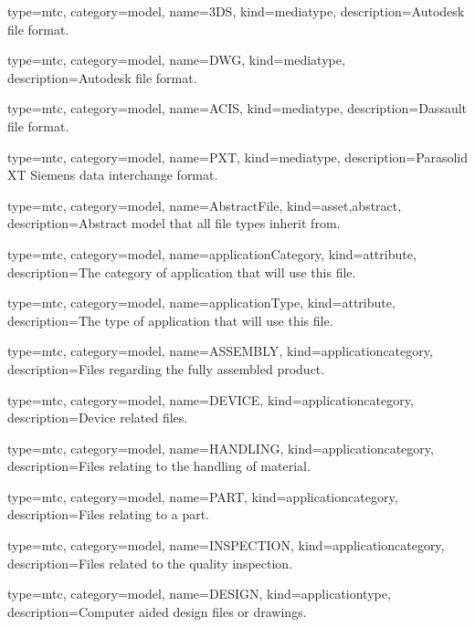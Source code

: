 {
  type=mtc,
  category=model,
  name={3DS},
  kind={mediatype},
  description={Autodesk file format.}
}

{
  type=mtc,
  category=model,
  name={DWG},
  kind={mediatype},
  description={Autodesk file format.}
}

{
  type=mtc,
  category=model,
  name={ACIS},
  kind={mediatype},
  description={Dassault file format.}
}

{
  type=mtc,
  category=model,
  name={PXT},
  kind={mediatype},
  description={Parasolid XT Siemens data interchange format.}
}

{
  type=mtc,
  category=model,
  name={AbstractFile},
  kind={asset,abstract},
  description={Abstract model that all file types inherit from.}
}

{
  type=mtc,
  category=model,
  name={applicationCategory},
  kind={attribute},
  description={The category of application that will use this file.}
}

{
  type=mtc,
  category=model,
  name={applicationType},
  kind={attribute},
  description={The type of application that will use this file.}
}

{
  type=mtc,
  category=model,
  name={ASSEMBLY},
  kind={applicationcategory},
  description={Files regarding the fully assembled product.}
}

{
  type=mtc,
  category=model,
  name={DEVICE},
  kind={applicationcategory},
  description={Device related files.}
}

{
  type=mtc,
  category=model,
  name={HANDLING},
  kind={applicationcategory},
  description={Files relating to the handling of material.}
}

{
  type=mtc,
  category=model,
  name={PART},
  kind={applicationcategory},
  description={Files relating to a part.}
}

{
  type=mtc,
  category=model,
  name={INSPECTION},
  kind={applicationcategory},
  description={Files related to the quality inspection.}
}

{
  type=mtc,
  category=model,
  name={DESIGN},
  kind={applicationtype},
  description={Computer aided design files or drawings.}
}

